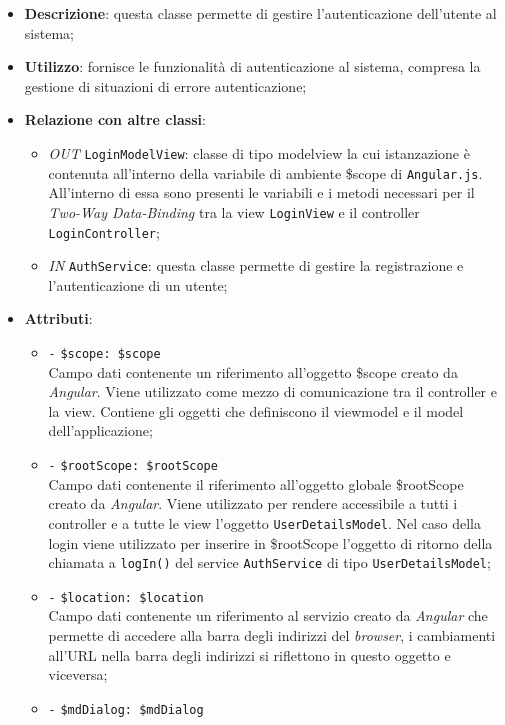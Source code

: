 \begin{itemize}
	\item \textbf{Descrizione}: questa classe permette di gestire l'autenticazione dell'utente al sistema; 
	\item \textbf{Utilizzo}: fornisce le funzionalità di autenticazione al sistema, compresa la gestione di situazioni di errore autenticazione;
	\item \textbf{Relazione con altre classi}:
	\begin{itemize}
		\item \textit{OUT} \texttt{LoginModelView}: classe di tipo modelview la cui istanzazione è contenuta all'interno della variabile di ambiente \$scope di \texttt{Angular.js}. All'interno di essa sono presenti le variabili e i metodi necessari per il \textit{Two-Way Data-Binding} tra la view \texttt{LoginView} e il controller \texttt{LoginController};
		\item \textit{IN} \texttt{AuthService}: questa classe permette di gestire la registrazione e l'autenticazione di un utente;
	\end{itemize}
	\item \textbf{Attributi}:
	\begin{itemize}
		\item \texttt{-} \texttt{\$scope: \$scope} \\
		Campo dati contenente un riferimento all’oggetto \$scope creato da \textit{Angular}. Viene utilizzato come mezzo di comunicazione tra il controller e la view. Contiene gli oggetti che definiscono il viewmodel e il model dell’applicazione;
		\item \texttt{-} \texttt{\$rootScope: \$rootScope} \\
		Campo dati contenente il riferimento all'oggetto globale \$rootScope creato da \textit{Angular}. Viene utilizzato per rendere accessibile a tutti i controller e a tutte le view l'oggetto \texttt{UserDetailsModel}. Nel caso della login viene utilizzato per inserire in \$rootScope l'oggetto di ritorno della chiamata a \texttt{logIn()} del service \texttt{AuthService} di tipo \texttt{UserDetailsModel};
		\item \texttt{-} \texttt{\$location: \$location} \\
		Campo dati contenente un riferimento al servizio creato da \textit{Angular} che permette di accedere alla barra degli indirizzi del \textit{browser}, i cambiamenti all’URL nella barra degli indirizzi si riflettono in questo oggetto e viceversa;
		\item \texttt{-} \texttt{\$mdDialog: \$mdDialog} \\

\end{itemize}
\end{itemize}
